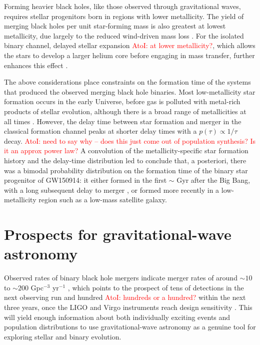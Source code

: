 \documentclass[iop,onecolumn]{revtex4}
\newcommand{\ajf}[1]{\textcolor{red}{AtoI: #1}}
\begin{document}
Forming heavier black holes, like those observed through gravitational waves, requires stellar progenitors born in regions with lower metallicity. The yield of merging black holes per unit star-forming mass is also greatest at lowest metallicity, due largely to the reduced wind-driven mass loss \citep[e.g.,][]{Belczynski:2010}. For the isolated binary channel, delayed stellar expansion \ajf{at lower metallicity?}, which allows the stars to develop a larger helium core before engaging in mass transfer, further enhances this effect \citep[e.g.,][]{Stevenson:2017}.

The above considerations place constraints on the formation time of the systems that produced the observed merging black hole binaries. Most low-metallicity star formation occurs in the early Universe, before gas is polluted with metal-rich products of stellar evolution, although there is a broad range of metallicities at all times \citep[e.g.,][]{LangerNorman:2006,TaylorKobayashi:2015}. However, the delay time between star formation and merger in the classical formation channel peaks at shorter delay times with a $p(\tau) \propto 1/\tau$ decay. \ajf{need to say why -- does this just come out of population synthesis? Is it an approx power law?} A convolution of the metallicity-specific star formation history and the delay-time distribution led \citet{Belczynski:2016} to conclude that, a posteriori, there was a bimodal probability distribution on the formation time of the binary star progenitor of GW150914: it either formed in the first $\sim$ Gyr after the Big Bang, with a long subsequent delay to merger \citep{Dominik:2014}, or formed more recently in a low-metallicity region such as a low-mass satellite galaxy.  

  


\section{Prospects for gravitational-wave astronomy}\label{prospect}

Observed rates of binary black hole mergers indicate merger rates of around $\sim 10$ to $\sim 200$ Gpc$^{-3}$ yr$^{-1}$ \citep{GW150914:rates,GW170104}, which points to the prospect of tens of detections in the next observing run and hundred \ajf{hundreds or a hundred?} within the next three years, once the LIGO and Virgo instruments reach design sensitivity \citep{scenarios}.  This will yield enough information about both individually exciting events and population distributions to use gravitational-wave astronomy as a genuine tool for exploring stellar and binary evolution.  
\end{document}
